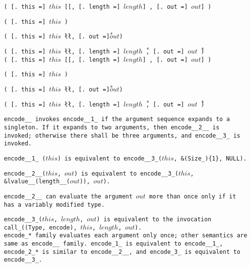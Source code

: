 
\s\s\s\s\tt{(} [\tt{. this =}] $this$ [[\tt{,}
[\tt{. length =}] $length$] \tt{,} [\tt{. out =}] $out$] \tt{)}

\s\s\tt{(} [\tt{. this =}] $this$ \tt{)}

\s\tt{(} [\tt{. this =}] $this$
\l\l\tt{,} [\tt{. out =}]\r $out$\r \tt{)}

\s\s\tt{(} [\tt{. this =}] $this$ \l\l\tt{,}
[\tt{. length =}] $length$\r\ \tt{,} [\tt{. out =}] $out$\r\ \tt{)}\\

\s\s\s\s\s\tt{(} [\tt{. this =}] $this$ [[\tt{,}
[\tt{. length =}] $length$] \tt{,} [\tt{. out =}] $out$] \tt{)}

\s\s\s\tt{(} [\tt{. this =}] $this$ \tt{)}

\s\s\s\tt{(} [\tt{. this =}] $this$
\l\l\tt{,} [\tt{. out =}]\r $out$\r \tt{)}

\s\s\s\tt{(} [\tt{. this =}] $this$ \l\l\tt{,}
[\tt{. length =}] $length$\r\ \tt{,} [\tt{. out =}] $out$\r\ \tt{)}


\tt{encode__} invokes \tt{encode__1_} if the argument sequence expands to a singleton.
If it expands to two arguments, then \tt{encode__2__} is invoked;
otherwise there shall be three arguments, and \tt{encode__3_} is invoked.

\tt{encode__1_ (}$this$\tt{)} is equivalent to
\tt{encode__3_(}$this$\tt{, &(Size_)\{1\}, NULL)}.

\tt{encode__2__(}$this$\tt{,} $out$\tt{)} is equivalent to
\tt{encode__3_(}$this$\tt{, &lvalue__(length__(}$out$\tt{)),} $out$\tt{)}.

\tt{encode__2__} can evaluate the argument $out$ more
than once only if it has a variably modified type.

\tt{encode__3_(}$this$\tt{,} $length$\tt{,} $out$\tt{)} is equivalent to the
invocation \tt{call_((Type, encode),}  $this$\tt{,} $length$\tt{,} $out$\tt{)}.\\

\tt{encode_}* family evaluates each argument only once;
other semantics are same as \tt{encode__} family.
\tt{encode_1_} is equivalent to \tt{encode__1_}, \tt{encode_2_}* is similar
to \tt{encode__2__}, and \tt{encode_3_} is equivalent to \tt{encode__3_}.
